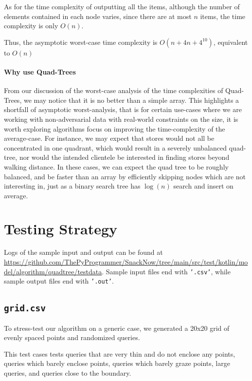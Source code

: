 \documentclass[12pt]{article}
\begin{document}
{As for the time complexity of outputting all the items, although the number of elements contained in each node varies, since there are at most $n$ items, the time complexity is only $O(n)$.


Thus, the asymptotic worst-case time complexity is $O(n + 4n + 4^{10})$, equivalent to $O(n)$

\paragraph{Why use Quad-Trees}

From our discussion of the worst-case analysis of the time complexities of Quad-Trees, we may notice that it is no better than a simple array. This highlights a shortfall of asymptotic worst-analysis, that is for certain use-cases where we are working with non-adversarial data with real-world constraints on the size, it is worth exploring algorithms focus on improving the time-complexity of the average-case. For instance, we may expect that stores would not all be concentrated in one quadrant, which would result in a severely unbalanced quad-tree, nor would the intended clientele be interested in finding stores beyond walking distance. In these cases, we can expect the quad tree to be roughly balanced, and be faster than an array by efficiently skipping nodes which are not interesting in, just as a binary search tree has $\log(n)$ search and insert on average.


\section{Testing Strategy}

Logs of the sample input and output can be found at \url{https://github.com/ThePyProgrammer/SnackNow/tree/main/src/test/kotlin/model/algorithm/quadtree/testdata}. Sample input files end with \texttt{'.csv'}, while sample output files end with \texttt{'.out'}.


\subsection{\texttt{grid.csv}}

To stress-test our algorithm on a generic case, we generated a 20x20 grid of evenly spaced points and randomized queries. 

This test cases tests queries that are very thin and do not enclose any points, queries which barely enclose points, queries which barely graze points, large queries, and queries close to the boundary.

}
\end{document}
